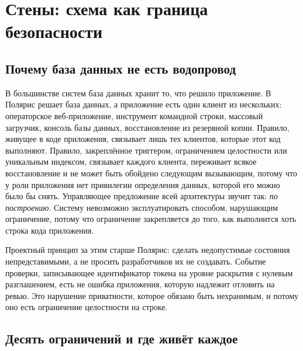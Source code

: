 \section{Стены: схема как граница безопасности}
\label{sec:walls}



\subsection{Почему база данных не есть водопровод}

В большинстве систем база данных хранит то, что решило приложение. В Полярис решает база данных, а
приложение есть один клиент из нескольких: операторское веб-приложение, инструмент командной
строки, массовый загрузчик, консоль базы данных, восстановление из резервной копии. Правило,
живущее в коде приложения, связывает лишь тех клиентов, которые этот код выполняют. Правило,
закреплённое триггером, ограничением целостности или уникальным индексом, связывает каждого
клиента, переживает всякое восстановление и не может быть обойдено следующим вызывающим, потому
что у роли приложения нет привилегии определения данных, которой его можно было бы снять.
Управляющее предложение всей архитектуры звучит так: \emph{по построению}. Систему невозможно
эксплуатировать способом, нарушающим ограничение, потому что ограничение закрепляется до того, как
выполнится хоть строка кода приложения. \sImpl

Проектный принцип за этим старше Полярис: сделать недопустимые состояния непредставимыми, а не
просить разработчиков их не создавать. Событие проверки, записывающее идентификатор токена на
уровне раскрытия с нулевым разглашением, есть не ошибка приложения, которую надлежит отловить на
ревью. Это нарушение приватности, которое обязано быть нехранимым, и потому оно есть ограничение
целостности на строке.

\subsection{Десять ограничений и где живёт каждое}

